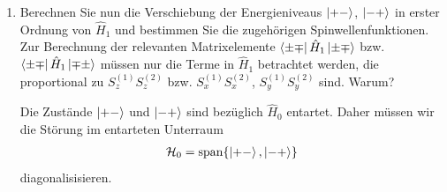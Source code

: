 \documentclass[11pt,a4paper]{scrartcl}
\newcommand{\op}[1]{\hat{#1}}
\begin{document}
\begin{enumerate}[label=(\alph*)]
\begin{calculationbox}
            \begin{calculationbox}[title=Energieverschiebungen von $\ket{++}$ und $\ket{--}$]
                Für beide Zustände ist
                \begin{align*}
                    \bra{++}S_z^{(1)}S_z^{(2)}\ket{++}
                    &=
                    \frac{\hbar}{2}\frac{\hbar}{2}
                    =
                    \frac{\hbar^2}{4},\\
                    \bra{--}S_z^{(1)}S_z^{(2)}\ket{--}
                    &=
                    \left(-\frac{\hbar}{2}\right)
                    \left(-\frac{\hbar}{2}\right)
                    =
                    \frac{\hbar^2}{4}.
                \end{align*}
                Also folgt
                \begin{align*}
                    \Delta E_{++}^{(1)}
                    =
                    \Delta E_{--}^{(1)}
                    =
                    \frac{\Omega}{\hbar}(1-3\cos^2\theta)\frac{\hbar^2}{4}.
                \end{align*}

                \begin{solutionbox}[title=Verschiebung der äußeren Niveaus]
                    \begin{align*}
                        \Delta E_{++}^{(1)}
                        =
                        \Delta E_{--}^{(1)}
                        =
                        \frac{\hbar\Omega}{4}(1-3\cos^2\theta).
                    \end{align*}
                \end{solutionbox}
            \end{calculationbox}
        \end{calculationbox}

        \item Berechnen Sie nun die Verschiebung der Energieniveaus $\ket{+-}$, $\ket{-+}$ in erster Ordnung von $\op H_1$ und bestimmen Sie die zugehörigen Spinwellenfunktionen. Zur Berechnung der relevanten Matrixelemente $\bra{\pm\mp}\op H_1\ket{\pm\mp}$ bzw. $\bra{\pm\mp}\op H_1\ket{\mp\pm}$ müssen nur die Terme in $\op H_1$ betrachtet werden, die proportional zu $S_z^{(1)}S_z^{(2)}$ bzw. $S_x^{(1)}S_x^{(2)}$, $S_y^{(1)}S_y^{(2)}$ sind. Warum?

        \begin{calculationbox}
            Die Zustände $\ket{+-}$ und $\ket{-+}$ sind bezüglich $\op H_0$ entartet. Daher müssen wir die Störung im entarteten Unterraum
            \begin{align*}
                \mathcal H_0=\operatorname{span}\{\ket{+-},\ket{-+}\}
            \end{align*}
            diagonalisisieren.


\end{calculationbox}
\end{enumerate}
\end{document}
